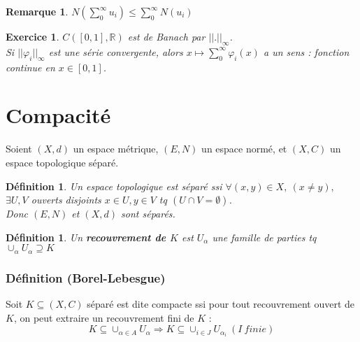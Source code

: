 \documentclass[a4paper, oneside]{report}
\theoremstyle{break}
\newtheorem{defi}[thm]{Définition}
\newtheorem{remar}[thm]{Remarque}
\newtheorem{exo}[thm]{Exercice}
\newcommand{\R}{\mathbb{R}}
\newcommand{\etop}{espace topologique }
\begin{document}
\begin{remar}
$N(\sum_{0}^\infty u_i) \leq \sum_{0}^\infty N(u_i)$
\end{remar}


\begin{exo}
$C([0,1], \R)$ est de Banach par $||.||_\infty$.\\
Si $||\varphi_i||_\infty$ est une série convergente, alors $x\mapsto \sum_{0}^\infty \varphi_i(x)$ a un sens : fonction continue en $x\in [0,1]$.
\end{exo}


\section{Compacité}

Soient $(X,d)$ un espace métrique, $(E,N)$ un espace normé, et $(X,C)$ un espace topologique séparé.\\

\begin{defi}                    
Un \etop est séparé ssi $\forall (x,y)\in X,~(x\neq y),$ $\exists U,V$ ouverts disjoints $x\in U, y\in V$ tq $(U\cap V = \emptyset)$.\\
Donc $(E,N)$ et $(X,d)$ sont séparés.
\end{defi}

\begin{defi}
Un \textbf{recouvrement de $K$} est $U_\alpha$ une famille de parties tq $\cup_\alpha U_\alpha \supseteq K$
\end{defi}


\subsubsection{Définition (Borel-Lebesgue)}
Soit $K\subseteq (X,C)$ séparé est dite compacte ssi pour tout recouvrement ouvert de $K$, on peut extraire un recouvrement fini de $K$ :
$$K\subseteq \cup_{\alpha \in A}U_\alpha \Rightarrow K\subseteq \cup_{i\in J}U_{\alpha_i}~(I~finie)$$
\end{document}
